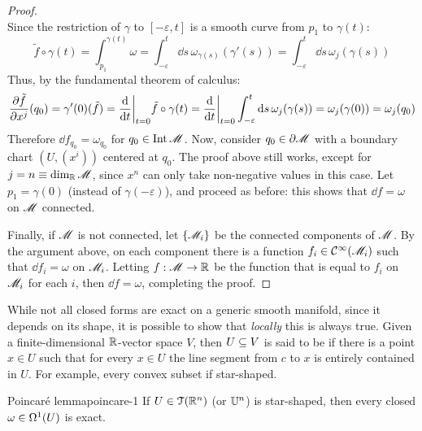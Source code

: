 \begin{proofbox}
\begin{proof}
\begin{equation*}
    \end{equation*}
    Since the restriction of $ \gamma $ to $ [-\varepsilon , t] $ is a smooth curve from $ p_1 $ to $ \gamma(t) $:
    \begin{equation*}
      \tilde{f} \circ \gamma(t) = \int_{p_1}^{\gamma(t)} \omega = \int_{-\varepsilon}^t \dd s \, \omega_{\gamma(s)}(\gamma'(s)) = \int_{-\varepsilon}^t \dd s \, \omega_j(\gamma(s))
    \end{equation*}
    Thus, by the fundamental theorem of calculus:
    \begin{equation*}
      \frac{\partial \tilde{f}}{\partial x^j}(q_0) = \gamma'(0)(\tilde{f}) = \frac{\mathrm{d}}{\mathrm{d} t} \bigg\vert_{t = 0} \tilde{f} \circ \gamma(t) = \frac{\mathrm{d}}{\mathrm{d} t} \bigg\vert_{t = 0} \int_{-\varepsilon}^t \mathrm{d} s \, \omega_j(\gamma(s)) = \omega_j(\gamma(0)) = \omega_j(q_0)
    \end{equation*}
    Therefore $ \dd f_{q_0} = \omega_{q_0} $ for $ q_0 \in \operatorname{Int} \mathscr{M} $. Now, consider $ q_0 \in \partial \mathscr{M} $ with a boundary chart $ (U,(x^i)) $ centered at $ q_0 $. The proof above still works, except for $ j = n \equiv \dim_{\mathbb{R}} \mathscr{M} $, since $ x^n $ can only take non-negative values in this case. Let $ p_1 = \gamma(0) $ (instead of $ \gamma(-\varepsilon) $), and proceed as before: this shows that $ \dd f = \omega $ on $ \mathscr{M} $ connected.

    Finally, if $ \mathscr{M} $ is not connected, let $ \{\mathscr{M}_i\} $ be the connected components of $ \mathscr{M} $. By the argument above, on each component there is a function $ f_i \in \mathcal{C}^{\infty}(\mathscr{M}_i) $ such that $ \dd f_i = \omega $ on $ \mathscr{M}_i $. Letting $ f : \mathscr{M} \rightarrow \mathbb{R} $ be the function that is equal to $ f_i $ on $ \mathscr{M}_i $ for each $ i $, then $ \dd f = \omega $, completing the proof.
  \end{proof}
\end{proofbox}

While not all closed forms are exact on a generic smooth manifold, since it depends on its shape, it is possible to show that \emph{locally} this is always true. Given a finite-dimensional $ \mathbb{R} $-vector space $ V $, then $ U \subseteq V $ is said to be  if there is a point $ x \in U $ such that for every $ x \in U $ the line segment from $ c $ to $ x $ is entirely contained in $ U $. For example, every convex subset if star-shaped.

\begin{theorem}{Poincaré lemma}{poincare-1}
  If $ U \in \EuScript{T}(\mathbb{R}^n) $ (or $ \mathbb{U}^n $) is star-shaped, then every closed $ \omega \in \Omega^{1}(U) $ is exact.
\end{theorem}

